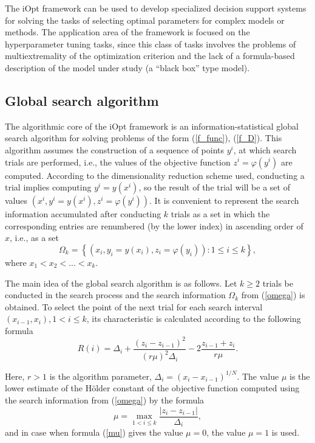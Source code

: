 \documentclass[preprint,12pt]{elsarticle}
\begin{document}
The iOpt framework can be used to develop specialized decision support systems for solving the tasks of selecting optimal parameters for complex models or methods. The application area of the framework is focused on the hyperparameter tuning tasks, since this class of tasks involves the problems of multiextremality of the optimization criterion and the lack of a formula-based description of the model under study (a ``black box'' type model).


\subsection{Global search algorithm}
\label{sec_GSA}

The algorithmic core of the iOpt framework is an information-statistical global search algorithm for solving problems of the form (\ref{f_func}), (\ref{f_D}). This algorithm assumes the construction of a sequence of points $y^i$,  at which search trials are performed, i.e., the values of the objective function $z^i = \varphi(y^i)$ are computed. According to the dimensionality reduction scheme used, conducting a trial implies computing $y^i=y(x^i)$, so the result of the trial will be a set of values $(x^i, y^i=y(x^i), z^i = \varphi(y^i))$. 
It is convenient to represent the search information accumulated after conducting $k$ trials as a set in which the corresponding entries are renumbered (by the lower index) in ascending order of $x$, i.e., as a set 
\begin{equation}\label{omega}
\Omega_k = \left\{  (x_i, y_i=y(x_i), z_i = \varphi(y_i)): 1 \leq i \leq k  \right\},	
\end{equation}
where $x_1 < x_2 < ... < x_k$.

The main idea of the global search algorithm is as follows. Let $k \geq 2$ trials be conducted in the search process and the search information $\Omega_k$ from (\ref{omega}) is obtained. To select the point of the next trial for each search interval $(x_{i-1},x_i), 1<i\leq k$, its characteristic is calculated according to the following formula
\begin{equation}\label{R}
R(i) = \Delta_i + \frac{(z_i-z_{i-1})^2}{(r\mu)^2\Delta_i}-2\frac{z_{i-1}+z_i}{r\mu}.	
\end{equation}

Here,  $r>1$ is the algorithm parameter, $\Delta_i=(x_i-x_{i-1})^{1/N}$.  The value $\mu$ is the lower estimate of the H\"older constant of the objective function computed using the search information from (\ref{omega}) by the formula
\begin{equation}\label{mu}
\mu = \max_{1<i\leq k}\frac{\left|z_i-z_{i-1}\right|}{\Delta_i},
\end{equation}
and in case when formula (\ref{mu}) gives the value $\mu=0$, the value $\mu=1$ is used.
\end{document}
